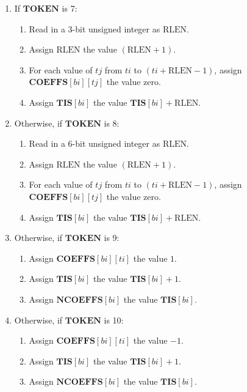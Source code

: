 \documentclass[9pt,letterpaper]{book}
\newcommand{\idx}[1]{{\ensuremath{\mathit{#1}}}}
\newcommand{\bi}{\idx{bi}}
\newcommand{\ti}{\idx{ti}}
\newcommand{\tj}{\idx{tj}}
\newcommand{\bitvar}[1]{\ensuremath{\mathbf{\bm{#1}}}}
\newcommand{\locvar}[1]{\ensuremath{\mathrm{#1}}}
\numberwithin{equation}{chapter}
\numberwithin{figure}{chapter}
\numberwithin{table}{chapter}
\begin{document}
\begin{enumerate}
\item
If \bitvar{TOKEN} is 7:
\begin{enumerate}
\item
Read in a 3-bit unsigned integer as \locvar{RLEN}.
\item
Assign \locvar{RLEN} the value $(\locvar{RLEN}+1)$.
\item
For each value of \locvar{\tj} from \bitvar{\ti} to
 $(\bitvar{\ti}+\locvar{RLEN}-1)$, assign
  $\bitvar{COEFFS}[\bitvar{\bi}][\locvar{\tj}]$ the value zero.
\item
Assign $\bitvar{TIS}[\bitvar{\bi}]$ the value
 $\bitvar{TIS}[\bitvar{\bi}]+\locvar{RLEN}$.
\end{enumerate}
\item
Otherwise, if \bitvar{TOKEN} is 8:
\begin{enumerate}
\item
Read in a 6-bit unsigned integer as \locvar{RLEN}.
\item
Assign \locvar{RLEN} the value $(\locvar{RLEN}+1)$.
\item
For each value of \locvar{\tj} from \bitvar{\ti} to
 $(\bitvar{\ti}+\locvar{RLEN}-1)$, assign
  $\bitvar{COEFFS}[\bitvar{\bi}][\locvar{\tj}]$ the value zero.
\item
Assign $\bitvar{TIS}[\bitvar{\bi}]$ the value
 $\bitvar{TIS}[\bitvar{\bi}]+\locvar{RLEN}$.
\end{enumerate}
\item
Otherwise, if \bitvar{TOKEN} is 9:
\begin{enumerate}
\item
Assign $\bitvar{COEFFS}[\bitvar{\bi}][\bitvar{\ti}]$ the value $1$.
\item
Assign $\bitvar{TIS}[\bitvar{\bi}]$ the value $\bitvar{TIS}[\bitvar{\bi}]+1$.
\item
Assign $\bitvar{NCOEFFS}[\bitvar{\bi}]$ the value $\bitvar{TIS}[\bitvar{\bi}]$.
\end{enumerate}
\item
Otherwise, if \bitvar{TOKEN} is 10:
\begin{enumerate}
\item
Assign $\bitvar{COEFFS}[\bitvar{\bi}][\bitvar{\ti}]$ the value $-1$.
\item
Assign $\bitvar{TIS}[\bitvar{\bi}]$ the value $\bitvar{TIS}[\bitvar{\bi}]+1$.
\item
Assign $\bitvar{NCOEFFS}[\bitvar{\bi}]$ the value $\bitvar{TIS}[\bitvar{\bi}]$.
\end{enumerate}

\end{enumerate}
\end{document}
